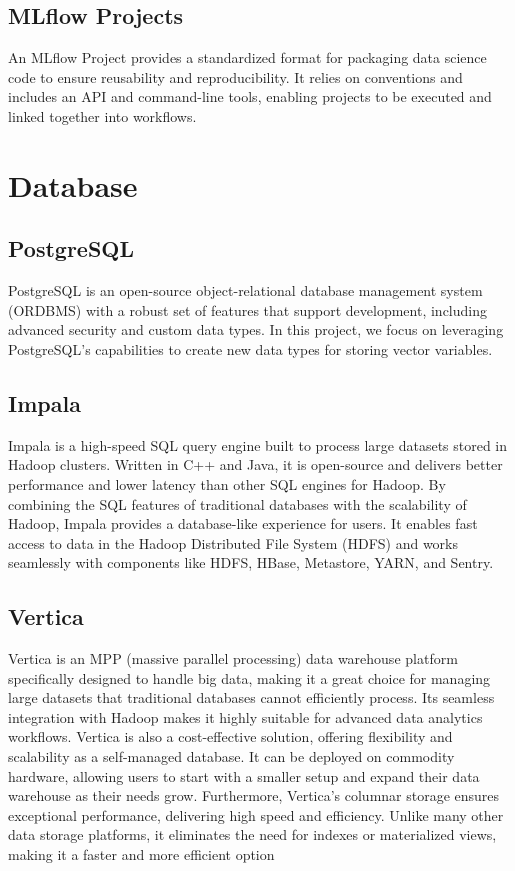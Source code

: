         \subsection{MLflow Projects}
        An MLflow Project provides a standardized format for packaging data science code to ensure reusability and reproducibility. It relies on conventions and includes an API and command-line tools, enabling projects to be executed and linked together into workflows.


\section{Database}
    \subsection{PostgreSQL}
    PostgreSQL is an open-source object-relational database management system (ORDBMS) with a robust set of features that support development, including advanced security and custom data types. In this project, we focus on leveraging PostgreSQL's capabilities to create new data types for storing vector variables.
    \subsection{Impala}
    Impala is a high-speed SQL query engine built to process large datasets stored in Hadoop clusters. Written in C++ and Java, it is open-source and delivers better performance and lower latency than other SQL engines for Hadoop. By combining the SQL features of traditional databases with the scalability of Hadoop, Impala provides a database-like experience for users. It enables fast access to data in the Hadoop Distributed File System (HDFS) and works seamlessly with components like HDFS, HBase, Metastore, YARN, and Sentry. 
    \cite{Tutorialspoint}
    \subsection{Vertica}
    Vertica is an MPP (massive parallel processing) data warehouse platform specifically designed to handle big data, making it a great choice for managing large datasets that traditional databases cannot efficiently process. Its seamless integration with Hadoop makes it highly suitable for advanced data analytics workflows. Vertica is also a cost-effective solution, offering flexibility and scalability as a self-managed database. It can be deployed on commodity hardware, allowing users to start with a smaller setup and expand their data warehouse as their needs grow. Furthermore, Vertica's columnar storage ensures exceptional performance, delivering high speed and efficiency. Unlike many other data storage platforms, it eliminates the need for indexes or materialized views, making it a faster and more efficient option
    \cite{Tobin}
